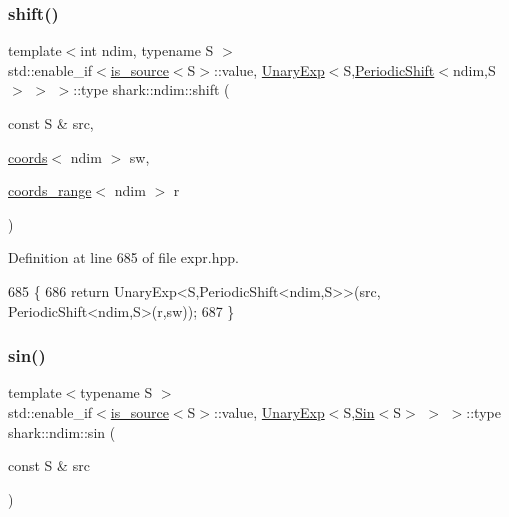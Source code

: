 \subsubsection{\texorpdfstring{shift()}{shift()}\hspace{0.1cm}{\footnotesize\ttfamily [2/2]}}
{\footnotesize\ttfamily template$<$int ndim, typename S $>$ \\
std\+::enable\+\_\+if$<$\hyperlink{classshark_1_1ndim_1_1is__source}{is\+\_\+source}$<$S$>$\+::value, \hyperlink{classshark_1_1ndim_1_1_unary_exp}{Unary\+Exp}$<$S,\hyperlink{classshark_1_1ndim_1_1_periodic_shift}{Periodic\+Shift}$<$ndim,S$>$ $>$ $>$\+::type shark\+::ndim\+::shift (\begin{DoxyParamCaption}\item[{const S \&}]{src,  }\item[{\hyperlink{structshark_1_1ndim_1_1coords}{coords}$<$ ndim $>$}]{sw,  }\item[{\hyperlink{structshark_1_1ndim_1_1coords__range}{coords\+\_\+range}$<$ ndim $>$}]{r }\end{DoxyParamCaption})}



Definition at line 685 of file expr.\+hpp.


\begin{DoxyCode}
685                                                                                                            
                                              \{
686             \textcolor{keywordflow}{return} UnaryExp<S,PeriodicShift<ndim,S>>(src, PeriodicShift<ndim,S>(r,sw));
687         \}
\end{DoxyCode}
\hypertarget{namespaceshark_1_1ndim_ad0b8060a85f85b70899c28e4fb9e7047}{}\label{namespaceshark_1_1ndim_ad0b8060a85f85b70899c28e4fb9e7047} 
\subsubsection{\texorpdfstring{sin()}{sin()}}
{\footnotesize\ttfamily template$<$typename S $>$ \\
std\+::enable\+\_\+if$<$\hyperlink{classshark_1_1ndim_1_1is__source}{is\+\_\+source}$<$S$>$\+::value, \hyperlink{classshark_1_1ndim_1_1_unary_exp}{Unary\+Exp}$<$S,\hyperlink{classshark_1_1ndim_1_1_sin}{Sin}$<$S$>$ $>$ $>$\+::type shark\+::ndim\+::sin (\begin{DoxyParamCaption}\item[{const S \&}]{src }\end{DoxyParamCaption})}



